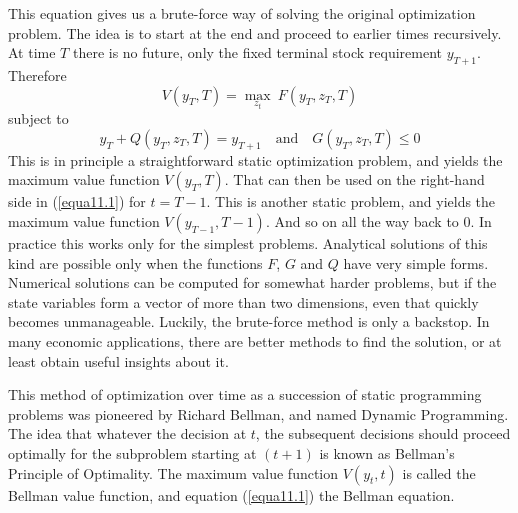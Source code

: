 This equation gives us a brute-force way of solving the original optimization problem. The idea is to start at the end and proceed to earlier times recursively. At time $T$ there is no future, only the fixed terminal stock requirement $y_{T+1}$. Therefore
\begin{equation*}
 V(y_T, T) = \mathop{\max}\limits_{z_t} \ F(y_T, z_T, T)
\end{equation*}
subject to
\begin{equation*}
y_T + Q(y_T, z_T, T) = y_{T+1}  \quad \mbox{and} \quad G(y_T, z_T, T) \leq 0
\end{equation*}
This is in principle a straightforward static optimization problem, and yields the maximum value function $V(y_T, T)$. That can then be used on the right-hand side in (\ref{equa11.1}) for $t=T-1$. This is another static problem, and yields the maximum value function $V(y_{T-1}, T-1)$. And so on all the way back to 0. In practice this works only for the simplest problems. Analytical solutions of this kind are possible only when the functions $F$, $G$ and $Q$ have very simple forms. Numerical solutions can be computed for somewhat harder problems, but if the state variables form a vector of more than two dimensions, even that quickly becomes unmanageable. Luckily, the brute-force method is only a backstop. In many economic applications, there are better methods to find the solution, or at least obtain useful insights about it.

This method of optimization over time as a succession of static programming problems was pioneered by Richard Bellman, and named Dynamic Programming. The idea that whatever the decision at $t$, the subsequent decisions should proceed optimally for the subproblem starting at $(t+1)$ is known as Bellman's Principle of Optimality. The maximum value function $V(y_t, t)$ is called the Bellman value function, and equation (\ref{equa11.1}) the Bellman equation.

